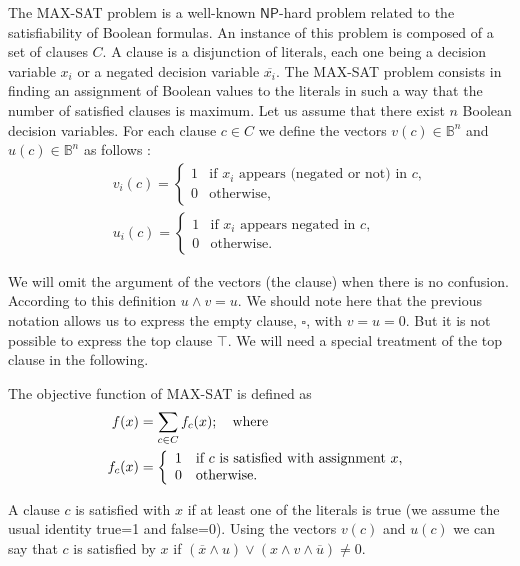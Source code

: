 \documentclass{article}
\newcommand{\Bo}[0]{\mathbb{B}}
\newcommand{\NP}[0]{\mathsf{NP}}
\begin{document}
The MAX-SAT problem is a well-known $\NP$-hard problem related to the satisfiability of Boolean formulas. An instance of this problem is composed of a set of clauses $C$. A clause is a disjunction of literals, each one being a decision variable $x_i$ or a negated decision variable $\overline{x_i}$. The MAX-SAT problem consists in finding an assignment of Boolean values to the literals in such a way that the number of satisfied clauses is maximum. Let us assume that there exist $n$ Boolean decision variables.
For each clause $c \in C$ we define the vectors $v(c) \in \Bo^n$ and $u(c) \in \Bo^n$ as follows \citep{Sutton2009}:
\begin{eqnarray}
&& v_i(c) = \left\{\begin{array}{ll}
1 & \mbox{if $x_i$ appears (negated or not) in $c$} ,\\
0 & \mbox{otherwise},
\end{array} \right. \\
&& u_i(c) = \left\{\begin{array}{ll}
1 & \mbox{if $x_i$ appears negated in $c$}, \\
0 & \mbox{otherwise}.
\end{array} \right.
\end{eqnarray}

We will omit the argument of the vectors (the clause) when there is no confusion. According to this definition $u \wedge v = u$. We should note here that the previous notation allows us to express the empty clause, $\square$, with $v=u=0$. But it is not possible to express the top clause $\top$. We will need a special treatment of the top clause in the following.

The objective function of MAX-SAT is defined as
\begin{align}
\label{eqn:f-maxsat}f(x) &= \sum_{c \in C} f_{c}(x); ~~~ \mbox{where} \notag \\
f_c(x) &= \left\{\begin{array}{ll}1 & \mbox{if $c$ is satisfied with assignment $x$}, \\ 
0 & \mbox{otherwise}.\end{array} \right.
\end{align}

A clause $c$ is satisfied with $x$ if at least one of the literals is true (we assume the usual identity true=1 and false=0). Using the vectors $v(c)$ and $u(c)$ we can say that $c$ is satisfied by $x$ if $(\overline{x} \wedge  u)  \vee  (x \wedge v \wedge \overline{u}) \neq 0$.
\end{document}
